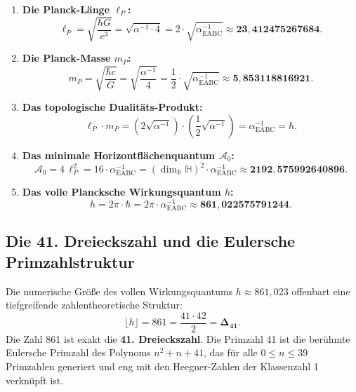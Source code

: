 \documentclass[11pt,a4paper]{article}
\theoremstyle{definition}
\theoremstyle{remark}
\numberwithin{equation}{section}
\begin{document}
\begin{enumerate}
    \item \textbf{Die Planck-Länge $\ell_P$:}
    \begin{equation}
    \ell_P = \sqrt{\frac{\hbar G}{c^3}} = \sqrt{\alpha^{-1} \cdot 4} = 2 \cdot \sqrt{\alpha^{-1}_{\mathrm{EABC}}} \approx \mathbf{23{,}412475267684}.
    \end{equation}
    \item \textbf{Die Planck-Masse $m_P$:}
    \begin{equation}
    m_P = \sqrt{\frac{\hbar c}{G}} = \sqrt{\frac{\alpha^{-1}}{4}} = \frac{1}{2} \cdot \sqrt{\alpha^{-1}_{\mathrm{EABC}}} \approx \mathbf{5{,}853118816921}.
    \end{equation}
    \item \textbf{Das topologische Dualitäts-Produkt:}
    \begin{equation}
    \ell_P \cdot m_P = \left(2\sqrt{\alpha^{-1}}\right) \cdot \left(\frac{1}{2}\sqrt{\alpha^{-1}}\right) = \alpha^{-1}_{\mathrm{EABC}} = \hbar.
    \end{equation}
    \item \textbf{Das minimale Horizontflächenquantum $\mathcal{A}_0$:}
    \begin{equation}
    \mathcal{A}_0 = 4\,\ell_P^2 = 16 \cdot \alpha^{-1}_{\mathrm{EABC}} = (\dim_{\mathbb{R}}\mathbb{H})^2 \cdot \alpha^{-1}_{\mathrm{EABC}} \approx \mathbf{2192{,}575992640896}.
    \end{equation}
    \item \textbf{Das volle Plancksche Wirkungsquantum $h$:}
    \begin{equation}
    h = 2\pi \cdot \hbar = 2\pi \cdot \alpha^{-1}_{\mathrm{EABC}} \approx \mathbf{861{,}022575791244}.
    \end{equation}
\end{enumerate}

\subsection{Die 41. Dreieckszahl und die Eulersche Primzahlstruktur}

Die numerische Größe des vollen Wirkungsquantums $h \approx 861{,}023$ offenbart eine tiefgreifende zahlentheoretische Struktur:
\begin{equation}
\lfloor h \rfloor = 861 = \frac{41 \cdot 42}{2} = \mathbf{\Delta_{41}}.
\end{equation}
Die Zahl 861 ist exakt die \textbf{41. Dreieckszahl}. Die Primzahl 41 ist die berühmte Eulersche Primzahl des Polynoms $n^2 + n + 41$, das für alle $0 \le n \le 39$ Primzahlen generiert und eng mit den Heegner-Zahlen der Klassenzahl 1 verknüpft ist. 
\end{document}
